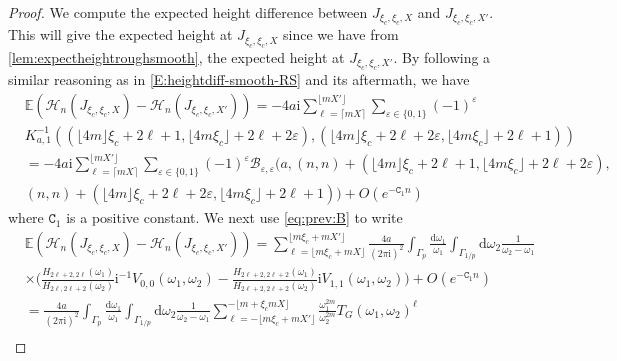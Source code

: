 \documentclass[11pt,twoside]{amsart}
\theoremstyle{plain}
\numberwithin{quest}{section}
\theoremstyle{remark}
\numberwithin{rem}{section}
\theoremstyle{definition}
\newcommand{\eps}{\varepsilon}
\begin{document}
	{
		
		
		\begin{proof}
			We compute the expected height difference between $J_{\xi_c,\xi_c,X}$ and $J_{\xi_c,\xi_c,X'}$. This will give the expected height at $J_{\xi_c,\xi_c,X}$ since we have from \cref{lem:expectheightroughsmooth}, the expected height at $J_{\xi_c,\xi_c,X'}$. By following a similar reasoning as in \eqref{E:heightdiff-smooth-RS} and its aftermath, we have
			\begin{equation*}
				\begin{split}
					&\mathbb{E}(\mathcal{H}_n(J_{\xi_c,\xi_c,X})-\mathcal{H}_n(J_{\xi_c,\xi_c,X'}))=-4a\mathrm{i} \sum_{\ell=\lceil mX \rceil}^{\lfloor mX' \rfloor} \sum_{\eps \in \{0,1\}}(-1)^{\eps}\\
					& K_{a,1}^{-1}((\lfloor 4m\rfloor \xi_c+2\ell+1 ,\lfloor 4m \xi_c \rfloor +2 \ell+2 \eps),(\lfloor 4m\rfloor \xi_c+2\ell+2 \eps,\lfloor 4m \xi_c \rfloor +2 \ell+1 ))\\
					&=-4a\mathrm{i} \sum_{\ell=\lceil mX \rceil}^{\lfloor mX' \rfloor} \sum_{\eps \in \{0,1\}}(-1)^{\eps}\mathcal{B}_{\eps,\eps}\bigg(a, (n,n)+(\lfloor 4m\rfloor \xi_c+2\ell+1 ,\lfloor 4m \xi_c \rfloor +2 \ell+2 \eps),\\
					& (n,n) +(\lfloor 4m\rfloor \xi_c+2\ell+2 \eps,\lfloor 4m \xi_c \rfloor +2 \ell+1 )\bigg)
					+O(e^{-\mathtt{C}_1n})
				\end{split}
			\end{equation*}
			where $\mathtt{C}_1$ is a positive constant.  We next use  \eqref{eq:prev:B} to write
			\begin{equation}
\begin{split}\label{eq:lemproof:expectheightintorough}
					&\mathbb{E}(\mathcal{H}_n(J_{\xi_c,\xi_c,X})-\mathcal{H}_n(J_{\xi_c,\xi_c,X'}))=\sum_{\ell=\lfloor m\xi_c+mX \rfloor}^{\lfloor m\xi_c+ mX'\rfloor}\frac{4a}{(2\pi \mathrm{i})^2}  \int_{\Gamma_p}\frac{\mathrm{d} \omega_1}{\omega_1} \int_{\Gamma_{1/p}} \mathrm{d}\omega_2 \frac{1}{\omega_2-\omega_1} \\
					&\times \bigg(\frac{H_{2\ell+2,2\ell}(\omega_1)}{H_{2\ell,2\ell+2}(\omega_2)} \mathrm{i}^{-1}V_{0,0}(\omega_1,\omega_2)-\frac{H_{2\ell+2,2\ell+2}(\omega_1)}{H_{2\ell+2,2\ell+2}(\omega_2)} \mathrm{i}V_{1,1}(\omega_1,\omega_2)\bigg) +O(e^{-\mathtt{C}_1n})\\
					&=\frac{4a}{(2\pi \mathrm{i})^2}  \int_{\Gamma_p}\frac{\mathrm{d} \omega_1}{\omega_1} \int_{\Gamma_{1/p}} \mathrm{d}\omega_2 \frac{1}{\omega_2-\omega_1} \sum_{\ell=-\lfloor m\xi_c+mX' \rfloor}^{-\lfloor m+\xi_c mX \rfloor} \frac{\omega_1^{2m}}{\omega_2^{2m}}T_G(\omega_1,\omega_2)^{\ell} \\

\end{split}
\end{equation}
\end{proof}}
\end{document}
